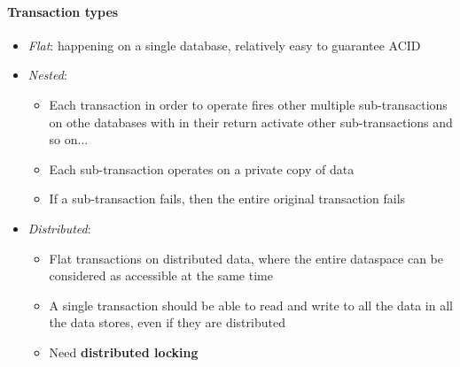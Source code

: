 \documentclass[10pt,a4paper]{article}
\begin{document}
\paragraph{Transaction types}
\begin{itemize}
	\item \textit{Flat}: happening on a single database, relatively easy to guarantee ACID
	\item \textit{Nested}: 
	\begin{itemize}
		\item Each transaction in order to operate fires other multiple sub-transactions on othe databases with in their return activate other sub-transactions and so on...
		\item Each sub-transaction operates on a private copy of data
		\item If a sub-transaction fails, then the entire original transaction fails
	\end{itemize}  
	\item \textit{Distributed}:
	\begin{itemize}
		\item Flat transactions on distributed data, where the entire dataspace can be considered as accessible at the same time
		\item A single transaction should be able to read and write to all the data in all the data stores, even if they are distributed
		\item Need \textbf{distributed locking}
	\end{itemize}  
\end{itemize}
\end{document}
